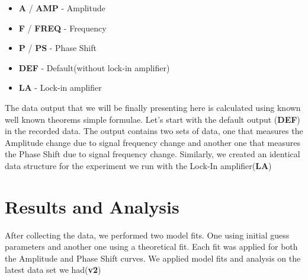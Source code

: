\documentclass[twocolumn]{article}\usepackage[english]{babel}
\begin{document}
\begin{itemize}

 \item{\textbf{A} / \textbf{AMP} - Amplitude}
 \item{\textbf{F} / \textbf{FREQ} - Frequency }
 \item{\textbf{P} / \textbf{PS}  - Phase Shift}
 \item{\textbf{DEF} - Default(without lock-in amplifier)}
 \item{\textbf{LA} - Lock-in amplifier}
\newline \newline
\end{itemize}
The data output that we will be finally presenting here is calculated using known well known theorems simple formulae. Let's start with the default output (\textbf{DEF}) in the recorded data. The output contains two sets of data, one that measures the Amplitude change due to signal frequency change and another one that measures the Phase Shift due to signal frequency change. Similarly, we created an  identical data structure for the experiment we run with the Lock-In amplifier(\textbf{LA})   

\section{Results and Analysis}

After collecting the data, we performed two  model fits. One using initial guess parameters and another one using a theoretical fit. Each fit was applied for both the Amplitude and Phase Shift curves. We applied model fits and analysis on the latest data set we had(\textbf{v2})
\end{document}
